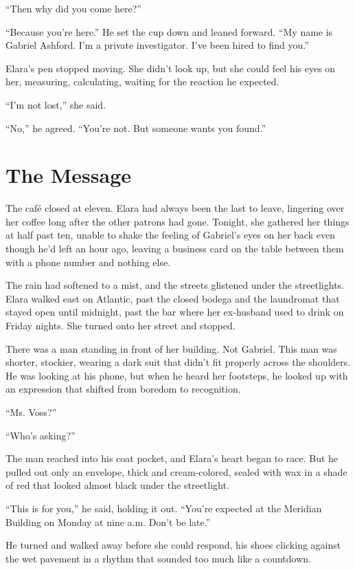 \documentclass[
    language=english,
    doctype=novel,
    institution=none,
]{../../omnilatex}
\begin{document}
``Then why did you come here?''

``Because you're here.'' He set the cup down and leaned forward. ``My name is Gabriel Ashford. I'm a private investigator. I've been hired to find you.''

Elara's pen stopped moving. She didn't look up, but she could feel his eyes on her, measuring, calculating, waiting for the reaction he expected.

``I'm not lost,'' she said.

``No,'' he agreed. ``You're not. But someone wants you found.''

\section{The Message}

The café closed at eleven. Elara had always been the last to leave, lingering over her coffee long after the other patrons had gone. Tonight, she gathered her things at half past ten, unable to shake the feeling of Gabriel's eyes on her back even though he'd left an hour ago, leaving a business card on the table between them with a phone number and nothing else.

The rain had softened to a mist, and the streets glistened under the streetlights. Elara walked east on Atlantic, past the closed bodega and the laundromat that stayed open until midnight, past the bar where her ex-husband used to drink on Friday nights. She turned onto her street and stopped.

There was a man standing in front of her building. Not Gabriel. This man was shorter, stockier, wearing a dark suit that didn't fit properly across the shoulders. He was looking at his phone, but when he heard her footsteps, he looked up with an expression that shifted from boredom to recognition.

``Ms. Voss?''

``Who's asking?''

The man reached into his coat pocket, and Elara's heart began to race. But he pulled out only an envelope, thick and cream-colored, sealed with wax in a shade of red that looked almost black under the streetlight.

``This is for you,'' he said, holding it out. ``You're expected at the Meridian Building on Monday at nine a.m. Don't be late.''

He turned and walked away before she could respond, his shoes clicking against the wet pavement in a rhythm that sounded too much like a countdown.
\end{document}
